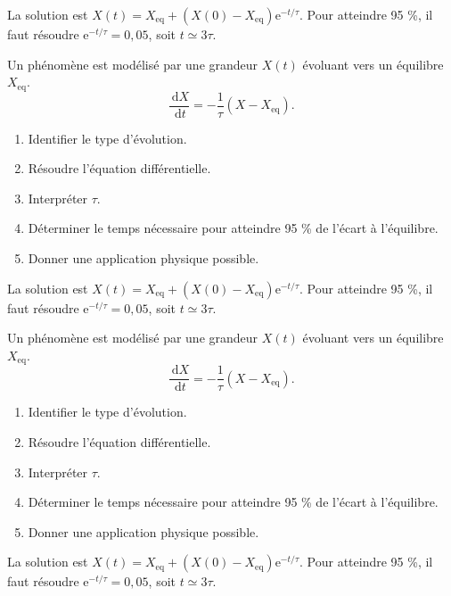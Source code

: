 \documentclass[11pt,a4paper]{article}
\newcommand{\dd}{\,\mathrm d}
\newcommand{\e}{\mathrm e}
\begin{document}
\begin{corrigebox}[Correction 4]
La solution est $X(t)=X_{\mathrm{eq}}+(X(0)-X_{\mathrm{eq}})\e^{-t/\tau}$. Pour atteindre 95 \%, il faut résoudre $\e^{-t/\tau}=0{,}05$, soit $t\simeq3\tau$.
\end{corrigebox}

\begin{exercicebox}
Un phénomène est modélisé par une grandeur $X(t)$ évoluant vers un équilibre $X_{\mathrm{eq}}$.
\[
\frac{\dd X}{\dd t}=-\frac1\tau(X-X_{\mathrm{eq}}).
\]
\begin{enumerate}
  \item Identifier le type d'évolution.
  \item Résoudre l'équation différentielle.
  \item Interpréter $\tau$.
  \item Déterminer le temps nécessaire pour atteindre 95 \% de l'écart à l'équilibre.
  \item Donner une application physique possible.
\end{enumerate}
\end{exercicebox}

\begin{corrigebox}[Correction 5]
La solution est $X(t)=X_{\mathrm{eq}}+(X(0)-X_{\mathrm{eq}})\e^{-t/\tau}$. Pour atteindre 95 \%, il faut résoudre $\e^{-t/\tau}=0{,}05$, soit $t\simeq3\tau$.
\end{corrigebox}

\begin{exercicebox}
Un phénomène est modélisé par une grandeur $X(t)$ évoluant vers un équilibre $X_{\mathrm{eq}}$.
\[
\frac{\dd X}{\dd t}=-\frac1\tau(X-X_{\mathrm{eq}}).
\]
\begin{enumerate}
  \item Identifier le type d'évolution.
  \item Résoudre l'équation différentielle.
  \item Interpréter $\tau$.
  \item Déterminer le temps nécessaire pour atteindre 95 \% de l'écart à l'équilibre.
  \item Donner une application physique possible.
\end{enumerate}
\end{exercicebox}

\begin{corrigebox}[Correction 6]
La solution est $X(t)=X_{\mathrm{eq}}+(X(0)-X_{\mathrm{eq}})\e^{-t/\tau}$. Pour atteindre 95 \%, il faut résoudre $\e^{-t/\tau}=0{,}05$, soit $t\simeq3\tau$.
\end{corrigebox}
\end{document}
